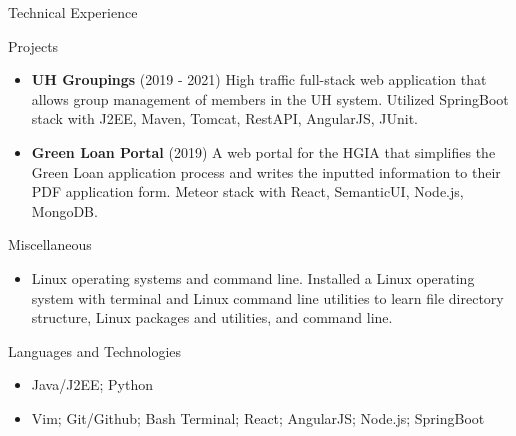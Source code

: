 \documentclass[]{mcdowellcv}
\begin{document}
	\begin{cvsection}{Technical Experience}
		\begin{cvsubsection}{Projects}{}{}
			\begin{itemize}
				\item \textbf{UH Groupings} (2019 - 2021) High traffic full-stack web application that allows group management of members in the UH system. Utilized SpringBoot stack with J2EE, Maven, Tomcat, RestAPI, AngularJS, JUnit.
				\item \textbf{Green Loan Portal} (2019) A web portal for the HGIA that simplifies the Green Loan application process and writes the inputted information to their PDF application form. Meteor stack with React, SemanticUI, Node.js, MongoDB.
			\end{itemize}
		\end{cvsubsection}
		\begin{cvsubsection}{Miscellaneous}{}{}
			\begin{itemize}
				\item Linux operating systems and command line. Installed a Linux operating system with terminal and Linux command line utilities to learn file directory structure, Linux packages and utilities, and command line.
			\end{itemize}
		\end{cvsubsection}
	\end{cvsection}
	
	\begin{cvsection}{Languages and Technologies}
		\begin{cvsubsection}{}{}{}	
			\begin{itemize}
				\item Java/J2EE; Python
				\item Vim; Git/Github; Bash Terminal; React; AngularJS; Node.js; SpringBoot
			\end{itemize}
		\end{cvsubsection}
	\end{cvsection}
	
\end{document}

